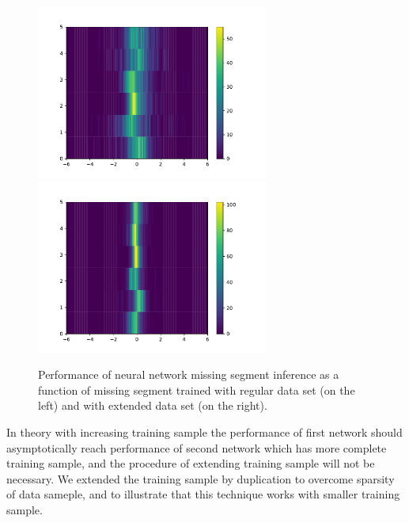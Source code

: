 \documentclass[12pt]{article}
\begin{document}
\begin{figure}[!ht]
\begin{center}
 \includegraphics[width=3.0in]{images/figure_2d_r.pdf}
 \includegraphics[width=3.0in]{images/figure_2d_n.pdf}
\caption {Performance of neural network missing segment inference as a function of missing segment trained with regular data  set (on the left) and with extended data set (on the right).}
 \label{ml:results2d}
 \end{center}
\end{figure}

In theory with increasing training sample the performance of first network should asymptotically reach performance of second network which has more complete training sample, and the procedure of extending training sample will not be necessary. We extended the training sample by duplication to overcome sparsity of data sameple, and to illustrate that this technique works
with smaller training sample.

\newpage


\end{document}
